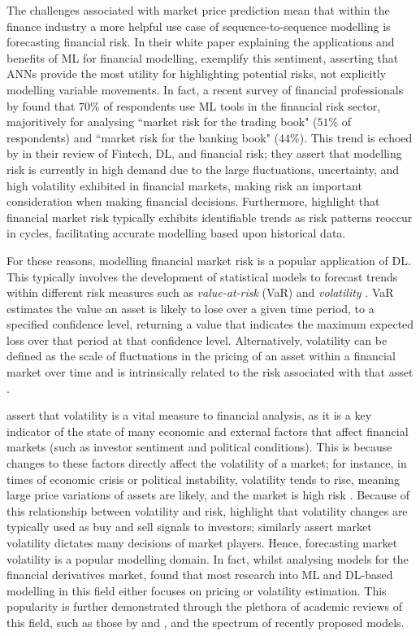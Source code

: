 \documentclass[a4paper, 11pt]{report}
\begin{document}
    The challenges associated with market price prediction mean that within the finance industry a more helpful use case of sequence-to-sequence modelling is forecasting financial risk. In their white paper explaining the applications and benefits of ML for financial modelling, \citet{laplante-2019} exemplify this sentiment, asserting that ANNs provide the most utility for highlighting potential risks, not explicitly modelling variable movements. In fact, a recent survey of financial professionals by \citet{chartis-2019} found that $70\%$ of respondents use ML tools in the financial risk sector, majoritively for analysing ``market risk for the trading book" ($51\%$ of respondents) and ``market risk for the banking book" ($44\%$). This trend is echoed by \citet{peng-2021} in their review of Fintech, DL, and financial risk; they assert that modelling risk is currently in high demand due to the large fluctuations, uncertainty, and high volatility exhibited in financial markets, making risk an important consideration when making financial decisions. Furthermore, \citet{mashrur-2020} highlight that financial market risk typically exhibits identifiable trends as risk patterns reoccur in cycles, facilitating accurate modelling based upon historical data.

    For these reasons, modelling financial market risk is a popular application of DL. This typically involves the development of statistical models to forecast trends within different risk measures such as \emph{value-at-risk} (VaR) and \emph{volatility} \citep{peng-2021}. VaR estimates the value an asset is likely to lose over a given time period, to a specified confidence level, returning a value that indicates the maximum expected loss over that period at that confidence level. Alternatively, volatility can be defined as the scale of fluctuations in the pricing of an asset within a financial market over time and is intrinsically related to the risk associated with that asset \citep{cavalcante-2016}.
    
    \citet{cavalcante-2016} assert that volatility is a vital measure to financial analysis, as it is a key indicator of the state of many economic and external factors that affect financial markets (such as investor sentiment and political conditions). This is because changes to these factors directly affect the volatility of a market; for instance, in times of economic crisis or political instability, volatility tends to rise, meaning large price variations of assets are likely, and the market is high risk \citep{sezer-2019}. Because of this relationship between volatility and risk, \citet{tino-2001} highlight that volatility changes are typically used as buy and sell signals to investors; \citet{ge-2022} similarly assert market volatility dictates many decisions of market players. Hence, forecasting market volatility is a popular modelling domain. In fact, whilst analysing models for the financial derivatives market, \citet{ozbayoglu-2020} found that most research into ML and DL-based modelling in this field either focuses on pricing or volatility estimation. This popularity is further demonstrated through the plethora of academic reviews of this field, such as those by \citet{poon-2003} and \citet{ge-2022}, and the spectrum of recently proposed models.
\end{document}
